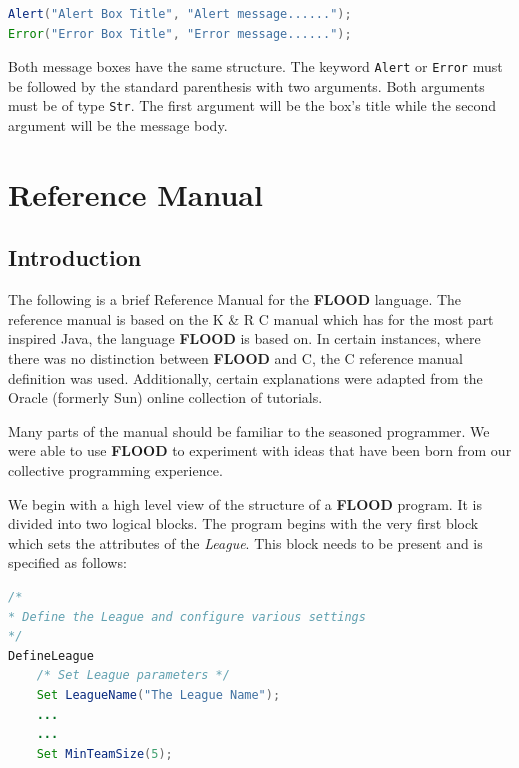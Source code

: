 \documentclass[12pt]{report}
\begin{document}
\begin{singlespace}
\begin{lstlisting}[language=Java,label=some-code,caption=Launching Alert and Error message boxes]
Alert("Alert Box Title", "Alert message......");
Error("Error Box Title", "Error message......");
\end{lstlisting}
\end{singlespace}

Both message boxes have the same structure. The keyword \texttt{Alert} or \texttt{Error} must be followed by the standard parenthesis with two arguments. Both arguments must be of type \texttt{Str}. The first argument will be the box's title while the second argument will be the message body.

\chapter{Reference Manual}

\section{Introduction}

The following is a brief Reference Manual for the \textbf{FLOOD} language. The reference manual is based on the K \& R C manual which has for the most part inspired Java, the language \textbf{FLOOD} is based on. In certain instances, where there was no distinction between \textbf{FLOOD} and C, the C reference manual definition was used. Additionally, certain explanations were adapted from the Oracle (formerly Sun) online collection of tutorials.

Many parts of the manual should be familiar to the seasoned programmer. We were able to use \textbf{FLOOD} to experiment with ideas that have been born from our collective programming experience. 

We begin with a high level view of the structure of a \textbf{FLOOD} program. It is divided into two logical blocks. The program begins with the very first block which sets the attributes of the \textit{League}. This block needs to be present and is specified as follows:

\begin{singlespace}
\begin{lstlisting}[language=Java,label=some-code,caption=DefineLeague]
/*
* Define the League and configure various settings
*/
DefineLeague
	/* Set League parameters */
	Set LeagueName("The League Name");
	...
	...
	Set MinTeamSize(5);
\end{lstlisting}
\end{singlespace}
\end{document}
